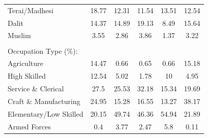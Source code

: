 \begin{landscape}
\begin{table}[!h]
{\begin{tabular}[t]{lccccc}
Terai/Madhesi & 18.77 & 12.31 & 11.54 & 13.51 & 12.54\\
Dalit & 14.37 & 14.89 & 19.13 & 8.49 & 15.64\\
\addlinespace
Muslim & 3.55 & 2.86 & 3.86 & 1.37 & 3.22\\
 &  &  &  &  & \\
Occupation Type (\%): &  &  &  &  & \\
Agriculture & 14.47 & 0.66 & 0.65 & 0.66 & 15.18\\
High Skilled & 12.54 & 5.02 & 1.78 & 10 & 4.95\\
\addlinespace
Service \& Clerical & 27.5 & 25.53 & 32.18 & 15.34 & 19.69\\
Craft \& Manufacturing & 24.95 & 15.28 & 16.55 & 13.27 & 38.17\\
Elementary/Low Skilled & 20.15 & 49.74 & 46.36 & 54.94 & 21.89\\
Armed Forces & 0.4 & 3.77 & 2.47 & 5.8 & 0.11\\
\bottomrule

\end{tabular}}
\end{table}
\end{landscape}
